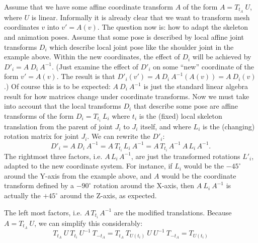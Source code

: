 Assume that we have some affine coordinate transform $A$ of the form $A=T_{t_A}\:U$, where $U$ is linear.
Informally it is already clear that we want to transform mesh coordinates $v$ into $v' =A(v)$.
The question now is: how to adapt the skeleton and animation poses.
Assume that some pose is described by local affine joint transforms $D_i$ which
describe local joint pose like the shoulder joint in the example above.
Within the new coordinates, the effect of $D_i$ will be achieved
by $D'_i = A\:D_i\:A^{-1}$.
(Just examine the effect of $D'_i$ on some ``new'' coordinate of the form $v' = A(v)$. The result is that
$D'_i(v') = A\:D_i\:A^{-1} (A(v)) = A\:D_i(v)$.)
Of course this is to be expected: $A\:D_i\:A^{-1}$ is just the standard linear algebra result
for how matrices change under coordinate transforms.
Now we must take into account that the local transforms $D_i$ that describe some pose
are affine transforms of the form $D_i = T_{t_i}\:L_i$ where $t_i$ is the (fixed) local skeleton translation
from the parent of joint $J_i$ to $J_i$ itself, and where $L_i$ is the (changing) rotation matrix for joint $J_i$.
We can rewrite the  $D'_i$:
\begin{equation}
D'_i = A\:D_i\:A^{-1} = A\:T_{t_i}\,L_i\:A^{-1}
=A\,T_{t_i}\,A^{-1}\:A\,L_i\,A^{-1}.
\end{equation}
The rightmost three factors, i.e. $A\,L_i\,A^{-1}$, are just the transformed rotations $L'_i$, adapted to
the new coordinate system. For instance, if $L_i$ would be the $-45^\circ$ around the Y-axis from the example
above, and $A$ would be the coordinate transform defined by a $-90^\circ$ rotation around the X-axis,
then $A\:L_i\:A^{-1}$ is actually the $+45^\circ$ around the Z-axis, as expected.

\noindent
The left most factors, i.e. $A\,T_{t_i}\,A^{-1}$ are the modified translations.
Because $A=T_{t_A}\:U$, we can simplify this considerably:
\begin{equation}\label{eq:transormedtranslation}
T_{t_A}\:U\:T_{t_i}\:U^{-1}\:T_{-t_A}
=T_{t_A}\:T_{U(t_i)}\:U\:U^{-1}\:T_{-t_A}
=T_{U(t_i)}
\end{equation}

